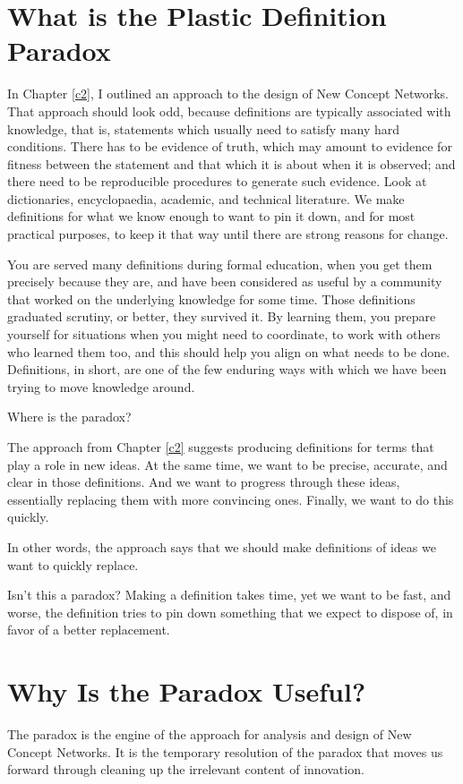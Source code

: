 \documentclass[graybox,envcountchap,sectrefs]{svmono}
\newcommand{\ncnf}{New Concept Network}
\newcommand{\newdef}[1]{Plastic Definition}
\newcommand{\ndparadox}[1]{\newdef{} Paradox}
\begin{document}
\section{What is the \ndparadox ?}
\label{c3:s1}
In Chapter \ref{c2}, I outlined an approach to the design of \ncnf s. That approach should look odd, because definitions are typically associated with knowledge, that is, statements which usually need to satisfy many hard conditions. There has to be evidence of truth, which may amount to evidence for fitness between the statement and that which it is about when it is observed; and there need to be reproducible procedures to generate such evidence. Look at dictionaries, encyclopaedia, academic, and technical literature. We make definitions for what we know enough to want to pin it down, and for most practical purposes, to keep it that way until there are strong reasons for change.

You are served many definitions during formal education, when you get them precisely because they are, and have been considered as useful by a community that worked on the underlying knowledge for some time. Those definitions graduated scrutiny, or better, they survived it. By learning them, you prepare yourself for situations when you might need to coordinate, to work with others who learned them too, and this should help you align on what needs to be done. Definitions, in short, are one of the few enduring ways with which we have been trying to move knowledge around.

Where is the paradox?

The approach from Chapter \ref{c2} suggests producing definitions for terms that play a role in new ideas. At the same time, we want to be precise, accurate, and clear in those definitions. And we want to progress through these ideas, essentially replacing them with more convincing ones. Finally, we want to do this quickly. 

In other words, the approach says that we should make definitions of ideas we want to quickly replace. 

Isn't this a paradox? Making a definition takes time, yet we want to be fast, and worse, the definition tries to pin down something that we expect to dispose of, in favor of a better replacement.

\section{Why Is the Paradox Useful?}
\label{c3:s2}
The paradox is the engine of the approach for analysis and design of \ncnf s. It is the temporary resolution of the paradox that moves us forward through cleaning up the irrelevant content of innovation. 
\end{document}
